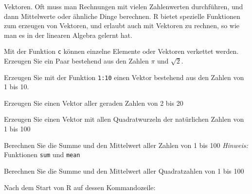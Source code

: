 Vektoren. Oft muss man Rechnungen mit vielen Zahlenwerten durchführen,
und dann Mittelwerte oder ähnliche Dinge berechnen. R bietet spezielle
Funktionen zum erzeugen von Vektoren, und erlaubt auch mit Vektoren
zu rechnen, so wie man es in der linearen Algebra gelernt hat.
\begin{teilaufgaben}
\item Mit der Funktion {\tt c} können einzelne Elemente oder
Vektoren verkettet werden. Erzeugen Sie ein Paar bestehend aus
den Zahlen $\pi$ und $\sqrt{2}$.
\item Erzeugen Sie mit der Funktion {\tt 1:10} einen Vektor bestehend
aus den Zahlen von 1 bis 10.
\item Erzeugen Sie einen Vektor aller geraden Zahlen von 2 bis 20
\item Erzeugen Sie einen Vektor mit allen Quadratwurzeln der natürlichen
Zahlen von 1 bis 100
\item Berechnen Sie die Summe und den Mittelwert aller Zahlen von 1 bis 100
\quad
{\it Hinweis\/:} Funktionen {\tt sum} und {\tt mean}
\item Berechnen Sie die Summe und den Mittelwert aller Quadratzahlen von 1 bis 100
\end{teilaufgaben}

\begin{loesung}
Nach dem Start von R auf dessen Kommandozeile:
\end{loesung}

